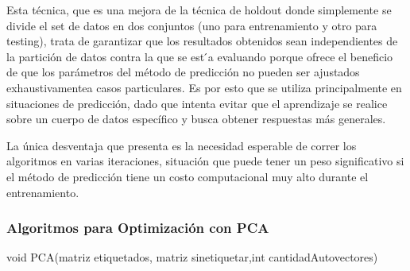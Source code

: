 Esta técnica, que es una mejora de la técnica de holdout donde simplemente se divide el set de datos en dos conjuntos (uno para entrenamiento y otro para testing), trata de garantizar que los resultados obtenidos sean independientes de la partición de datos contra la que se est ́a evaluando porque ofrece el beneficio de que los parámetros del método de predicción no pueden ser ajustados exhaustivamentea casos particulares. Es por esto que se utiliza principalmente en situaciones de predicción, dado que intenta evitar que el aprendizaje se realice sobre un cuerpo de datos específico y busca obtener respuestas más generales.

La única desventaja que presenta es la necesidad esperable de correr los algoritmos en varias iteraciones, situación que puede tener un peso significativo si el método de predicción tiene un costo computacional muy alto durante el entrenamiento.


\subsubsection {Algoritmos para Optimización con PCA}

\begin{algorithm}
    \begin{algorithmic}[1]\parskip=2mm
        \caption{void PCA(matriz etiquetados, matriz sinetiquetar,int cantidadAutovectores)}
        \\
        \\
        \\
        \\
        \\
        \\
        \\
        \\
        \\
    \end{algorithmic}
\end{algorithm}


